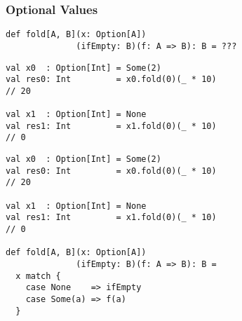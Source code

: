 \documentclass[include/preamble.tex]{subfiles}
\begin{document}
\begin{frame}[fragile]
  \frametitle{Optional Values}
  \begin{center}
  \end{center}
\end{frame}

\begin{frame}[fragile]
  \begin{center}
    \begin{lstlisting}[style=scala]
def fold[A, B](x: Option[A])
              (ifEmpty: B)(f: A => B): B = ???
    \end{lstlisting}
    \pause
    \vspace{1em}
    \begin{lstlisting}[style=scala]
val x0  : Option[Int] = Some(2)
val res0: Int         = x0.fold(0)(_ * 10)
// 20

val x1  : Option[Int] = None
val res1: Int         = x1.fold(0)(_ * 10)
// 0
    \end{lstlisting}
  \end{center}
\end{frame}

\begin{frame}[fragile]
  \begin{center}
    \begin{lstlisting}[style=scala]
val x0  : Option[Int] = Some(2)
val res0: Int         = x0.fold(0)(_ * 10)
// 20

val x1  : Option[Int] = None
val res1: Int         = x1.fold(0)(_ * 10)
// 0

def fold[A, B](x: Option[A])
              (ifEmpty: B)(f: A => B): B =
  x match {
    case None    => ifEmpty
    case Some(a) => f(a)
  }
    \end{lstlisting}
  \end{center}
\end{frame}
\end{document}
